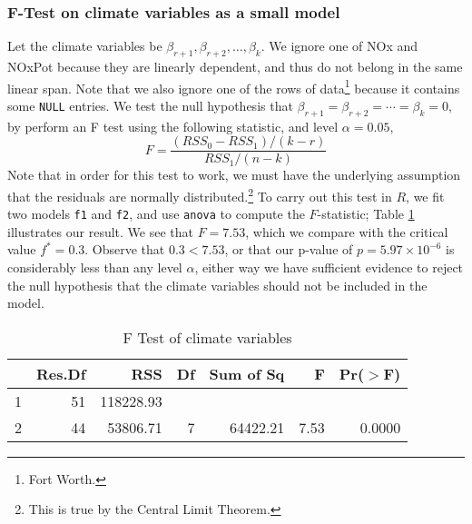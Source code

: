 \documentclass{amsart}\usepackage[]{graphicx}\usepackage[]{color}
\begin{document}
			\subsubsection{F-Test on climate variables as a small model} %
			\label{ssub:FTestClimate}


			Let the climate variables be $\beta_{r+1}, \beta_{r+2}, \dots, \beta_{k}$.
			We ignore one of NOx and NOxPot because they are linearly dependent, and thus do not belong in the same linear span.
			Note that we also ignore one of the rows of data\footnote{Fort Worth.} because it contains some \verb|NULL| entries.
			We test the null hypothesis that $\beta_{r+1} = \beta_{r+2} = \cdots = \beta_{k} = 0$, by perform an F test using the following statistic, and level $\alpha = 0.05$,
			$$F = \frac{(RSS_{0} - RSS_{1})/(k-r)}{RSS_{1}/(n-k)}$$
            Note that in order for this test to work, we must have the underlying assumption that the residuals are normally distributed.\footnote{This is true by the Central Limit Theorem.}
            To carry out this test in $R$, we fit two models \verb|f1| and \verb|f2|, and use \verb|anova| to compute the $F$-statistic; Table \ref{FTest} illustrates our result.
            We see that $F = 7.53$, which we compare with the critical value $f^{*} = 0.3$.
            Observe that $0.3 < 7.53$, or that our p-value of $p = \ensuremath{5.97\times 10^{-6}}$ is considerably less than any level $\alpha$, either way we have sufficient evidence to reject the null hypothesis that the climate variables should not be included in the model.
\begin{table}[ht]
\centering
\begin{tabular}{lrrrrrr}
  \hline
 & Res.Df & RSS & Df & Sum of Sq & F & Pr($>$F) \\ 
  \hline
1 & 51 & 118228.93 &  &  &  &  \\ 
  2 & 44 & 53806.71 & 7 & 64422.21 & 7.53 & 0.0000 \\ 
   \hline
\end{tabular}
\caption{F Test of climate variables} 
\label{FTest}
\end{table}

\end{document}
